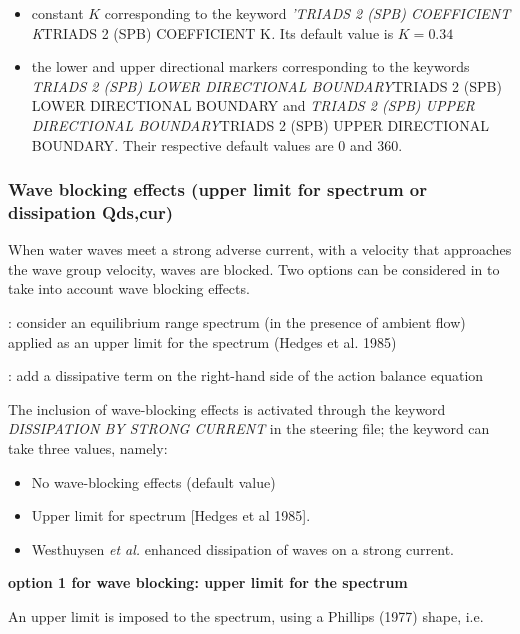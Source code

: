 \begin{itemize}
\item  constant $K$ corresponding to the keyword \textit{'TRIADS 2 (SPB) COEFFICIENT K}TRIADS 2 (SPB) COEFFICIENT K\textit{.} Its default value is $K=0.34$

\item  the lower and upper directional markers corresponding to the keywords \textit{TRIADS 2 (SPB) LOWER DIRECTIONAL BOUNDARY}TRIADS 2 (SPB) LOWER DIRECTIONAL BOUNDARY\textit{ }and \textit{TRIADS 2 (SPB) UPPER DIRECTIONAL BOUNDARY}TRIADS 2 (SPB) UPPER DIRECTIONAL BOUNDARY\textit{.} Their respective default values are 0 and 360.
\end{itemize}


\subsubsection{ Wave blocking effects (upper limit for spectrum or dissipation Qds,cur)}

 When water waves meet a strong adverse current, with a velocity that approaches the wave group velocity, waves are blocked. Two options can be considered in \tomawac to take into account wave blocking effects.

  : consider an equilibrium range spectrum (in the presence of ambient flow) applied as an upper limit for the spectrum (Hedges et al. 1985)

  : add a dissipative term on the right-hand side of the action balance equation \cite{Westhuys2012}

 The inclusion of wave-blocking effects is activated through the keyword \textit{DISSIPATION BY STRONG CURRENT} in the steering file; the keyword can take three values, namely:

\begin{itemize}
\item  No wave-blocking effects (default value)

\item  Upper limit for spectrum [Hedges et al 1985].

\item  Westhuysen \textit{et al.} \cite{Westhuys2012} enhanced dissipation of waves on a strong current.
\end{itemize}


{\bf  option 1 for wave blocking: upper limit for the spectrum}

 An upper limit is imposed to the spectrum, using a Phillips (1977) shape, i.e.

